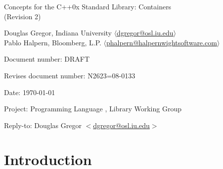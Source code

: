 \documentclass[american,twoside]{book}
\begin{document}
\raggedbottom

\begin{titlepage}
\begin{center}
\huge
Concepts for the C++0x Standard Library: Containers\\
(Revision 2)

\vspace{0.5in}

\normalsize
Douglas Gregor, Indiana University $\langle$\href{mailto:dgregor@osl.iu.edu}{dgregor@osl.iu.edu}$\rangle$ \\
Pablo Halpern,  Bloomberg, L.P. $\langle$\href{mailto:phalpern@halpernwightsoftware.com}{phalpern@halpernwightsoftware.com}$\rangle$

\end{center}

\vspace{1in}
\par\noindent Document number: DRAFT\vspace{-6pt}
\par\noindent Revises document number: N2623=08-0133\vspace{-6pt}
\par\noindent Date: \today\vspace{-6pt}
\par\noindent Project: Programming Language \Cpp{}, Library Working Group\vspace{-6pt}
\par\noindent Reply-to: Douglas Gregor $<$\href{mailto:dgregor@osl.iu.edu}{dgregor@osl.iu.edu}$>$\vspace{-6pt}

\section*{Introduction}
\end{titlepage}

\pagestyle{fancy}
\fancyhead[LE,RO]{\textbf{\rightmark}}
\fancyhead[RE]{\textbf{\leftmark\hspace{1em}\thepage}}
\fancyhead[LO]{\textbf{\thepage\hspace{1em}\leftmark}}


\renewcommand{\sectionmark}[1]{\markright{\thesection\hspace{1em}#1}}
\renewcommand{\chaptermark}[1]{\markboth{#1}{}}
\end{document}
